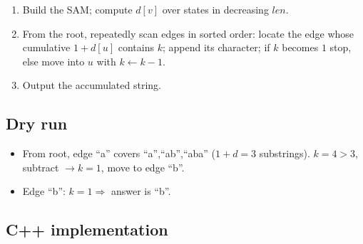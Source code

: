 \begin{enumerate}
  \item Build the SAM; compute $d[v]$ over states in decreasing
        $\textit{len}$.
  \item From the root, repeatedly scan edges in sorted order: locate the
        edge whose cumulative $1+d[u]$ contains $k$; append its character;
        if $k$ becomes $1$ stop, else move into $u$ with $k\gets k-1$.
  \item Output the accumulated string.
\end{enumerate}

\subsection*{Dry run}


\begin{itemize}
  \item From root, edge ``a'' covers ``a'',``ab'',``aba'' ($1+d=3$
        substrings). $k=4>3$, subtract $\to k=1$, move to edge ``b''.
  \item Edge ``b'': $k=1\Rightarrow$ answer is ``b''.
\end{itemize}

\subsection*{C++ implementation}

